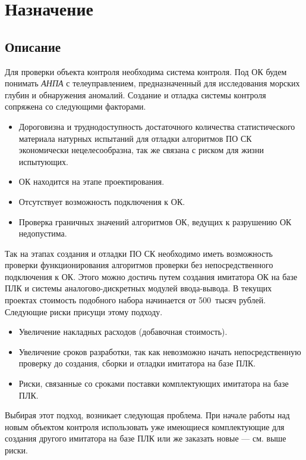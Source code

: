 \chapter*{Назначение}
\section*{Описание}

Для проверки объекта контроля необходима система контроля.
Под ОК будем понимать \textit{АНПА} с телеуправлением,
предназначенный для исследования морских глубин и обнаружения аномалий.
Создание и отладка системы контроля сопряжена со следующими факторами.
%
\begin{itemize}
    \item Дороговизна и труднодоступность достаточного количества статистического материала
    натурных испытаний для отладки алгоритмов ПО СК экономически нецелесообразна, так же связана с риском для жизни испытующих.
    \item ОК находится на этапе проектирования.
    \item Отсутствует возможность подключения к ОК.
    \item Проверка граничных значений алгоритмов ОК, ведущих к разрушению ОК недопустима.
\end{itemize}

Так на этапах создания и отладки ПО СК необходимо иметь возможность проверки
функционирования алгоритмов проверки без непосредственного подключения к ОК.
Этого можно достичь путем создания имитатора ОК на базе ПЛК и системы аналогово-дискретных
модулей ввода-вывода.
В  текущих проектах стоимость подобного набора начинается от 500~тысяч рублей.
Следующие риски присущи этому подходу.
\begin{itemize}
    \item Увеличение накладных расходов (добавочная стоимость).
    \item Увеличение сроков разработки, так как невозможно начать непосредственную проверку до 
        создания, сборки и отладки имитатора на базе ПЛК.
    \item Риски, связанные со сроками поставки комплектующих имитатора на базе ПЛК.
\end{itemize}
Выбирая этот подход, возникает следующая проблема. При начале работы над новым объектом контроля
использовать уже имеющиеся комплектующие для создания другого имитатора на базе ПЛК
или же заказать новые --- см. выше риски.

